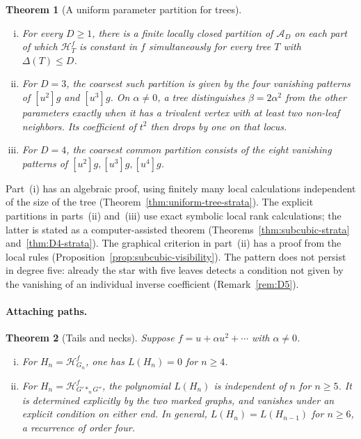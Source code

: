 \documentclass[reqno]{article}
\theoremstyle{plain} %
\newtheorem{mainthm}{Theorem}
\theoremstyle{definition}
\theoremstyle{remark}
\newcommand{\cA}{{\mathscr{A}}}
\newcommand{\hs}{\mathscr{H}}
\numberwithin{equation}{section}
\begin{document}
\begin{mainthm}[A uniform parameter partition for trees]\label{thmB}
\leavevmode
\begin{enumerate}[(i)]
\item For every $D\ge1$, there is a finite locally closed partition of
$\cA_D$ on each part of which $\hs_T^f$ is constant in $f$
\emph{simultaneously for every tree $T$ with $\Delta(T)\le D$}.
\item For $D=3$, the coarsest such partition is given by the four
vanishing patterns of $[u^2]g$ and $[u^3]g$. On $\alpha\ne0$, a tree
distinguishes $\beta=2\alpha^2$ from the other parameters exactly when
it has a trivalent vertex with at least two non-leaf neighbors. Its
coefficient of $t^2$ then drops by one on that locus.
\item For $D=4$, the coarsest common partition consists of the eight
vanishing patterns of $[u^2]g,[u^3]g,[u^4]g$.
\end{enumerate}
\end{mainthm}

Part~(i) has an algebraic proof, using finitely many local calculations
independent of the size of the tree (Theorem~\ref{thm:uniform-tree-strata}).
The explicit partitions in parts~(ii) and~(iii) use exact symbolic local
rank calculations; the latter is stated as a computer-assisted theorem
(Theorems~\ref{thm:subcubic-strata} and~\ref{thm:D4-strata}). The
graphical criterion in part~(ii) has a proof from the local rules
(Proposition~\ref{prop:subcubic-visibility}). The pattern does not
persist in degree five: already the star with five leaves detects a
condition not given by the vanishing of an individual inverse coefficient
(Remark~\ref{rem:D5}).

\paragraph{Attaching paths.}
\begin{mainthm}[Tails and necks]\label{thmC}
Suppose $f=u+\alpha u^2+\cdots$ with $\alpha\ne0$.
\begin{enumerate}[(i)]
\item For $H_n=\hs_{G_n}^f$, one has $L(H_n)=0$ for $n\ge4$.
\item For $H_n=\hs_{G'\ast_nG''}^f$, the polynomial $L(H_n)$ is
independent of $n$ for $n\ge5$. It is determined explicitly by the two
marked graphs, and vanishes under an explicit condition on either end.
In general, $L(H_n)=L(H_{n-1})$ for $n\ge6$, a recurrence of order four.
\end{enumerate}
\end{mainthm}
\end{document}
